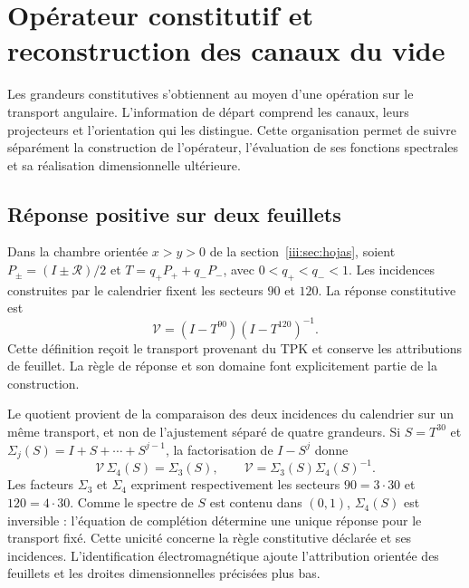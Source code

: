 \section{Opérateur constitutif et reconstruction des canaux du vide}
\label{iii:sec:constitutiva}

Les grandeurs constitutives s'obtiennent au moyen d'une opération sur le transport angulaire. L'information de départ comprend les canaux, leurs projecteurs et l'orientation qui les distingue. Cette organisation permet de suivre séparément la construction de l'opérateur, l'évaluation de ses fonctions spectrales et sa réalisation dimensionnelle ultérieure.

\subsection{Réponse positive sur deux feuillets}

Dans la chambre orientée $x>y>0$ de la section~\ref{iii:sec:hojas}, soient
$P_\pm=(I\pm\mathcal R)/2$ et
$T=q_+P_++q_-P_-$, avec $0<q_+<q_-<1$. Les incidences construites par le
calendrier fixent les secteurs $90$ et $120$. La réponse constitutive est
\begin{equation}
 \mathcal V=(I-T^{90})(I-T^{120})^{-1}.
 \label{iii:eq:vacuum-op}
\end{equation}
Cette définition reçoit le transport provenant du TPK et conserve les
attributions de feuillet. La règle de réponse et son domaine font explicitement partie
de la construction.

Le quotient provient de la comparaison des deux incidences du calendrier sur un même transport, et non de l'ajustement séparé de quatre grandeurs. Si $S=T^{30}$ et $\Sigma_j(S)=I+S+\cdots+S^{j-1}$, la factorisation de $I-S^j$ donne
\begin{equation}
 \mathcal V\,\Sigma_4(S)=\Sigma_3(S),\qquad
 \mathcal V=\Sigma_3(S)\Sigma_4(S)^{-1}.
 \label{iii:eq:completion-response}
\end{equation}
Les facteurs $\Sigma_3$ et $\Sigma_4$ expriment respectivement les
secteurs $90=3\cdot30$ et $120=4\cdot30$. Comme le spectre de $S$ est
contenu dans $(0,1)$, $\Sigma_4(S)$ est inversible : l’équation de
complétion détermine une unique réponse pour le transport fixé.
Cette unicité concerne la règle constitutive déclarée et ses
incidences. L’identification électromagnétique ajoute l’attribution
orientée des feuillets et les droites dimensionnelles précisées plus
bas.

